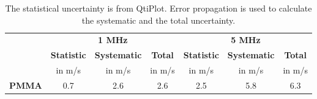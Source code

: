 \hspace{0.5cm}

\begin{table}[H]
	\centering
	\renewcommand{\arraystretch}{1.1}
	\begin{tabular}{|l|c|c|c||c|c|c|}
		\cline{2-7}
		\multicolumn{1}{c|}{} & \multicolumn{3}{c||}{\textbf{1 MHz}} & \multicolumn{3}{c|}{\textbf{5 MHz}} \\
		\cline{2-7}
		\multicolumn{1}{c|}{} & \textbf{Statistic} & \textbf{Systematic} & \textbf{Total} & \textbf{Statistic} & \textbf{Systematic} & \textbf{Total} \\
		\multicolumn{1}{c|}{} & in m/s & in m/s & in m/s & in m/s & in m/s & in m/s \\
		\hline
		\textbf{PMMA} & 0.7 & 2.6 & 2.6 & 2.5 & 5.8 & 6.3 \\
		\hline
	\end{tabular}
	\caption{The statistical uncertainty is from QtiPlot. Error propagation is used to calculate the systematic and the total uncertainty.}
	\label{tab:Uncertainty_Attenuation_Coefficient}
\end{table}
